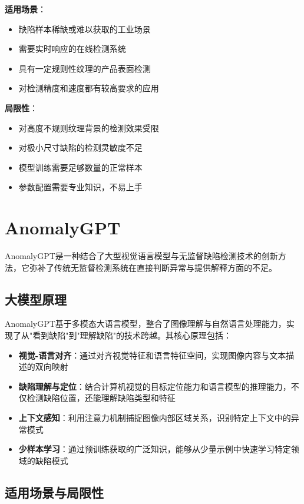 \documentclass[
  ]{njuthesis}
\begin{document}
\textbf{适用场景}：
\begin{itemize}
    \item 缺陷样本稀缺或难以获取的工业场景
    \item 需要实时响应的在线检测系统
    \item 具有一定规则性纹理的产品表面检测
    \item 对检测精度和速度都有较高要求的应用
\end{itemize}

\textbf{局限性}：
\begin{itemize}
    \item 对高度不规则纹理背景的检测效果受限
    \item 对极小尺寸缺陷的检测灵敏度不足
    \item 模型训练需要足够数量的正常样本
    \item 参数配置需要专业知识，不易上手
\end{itemize}

\section{AnomalyGPT}

AnomalyGPT是一种结合了大型视觉语言模型与无监督缺陷检测技术的创新方法，它弥补了传统无监督检测系统在直接判断异常与提供解释方面的不足。

\subsection{大模型原理}

AnomalyGPT基于多模态大语言模型，整合了图像理解与自然语言处理能力，实现了从"看到缺陷"到"理解缺陷"的技术跨越。其核心原理包括：
\begin{itemize}
    \item \textbf{视觉-语言对齐}：通过对齐视觉特征和语言特征空间，实现图像内容与文本描述的双向映射
    \item \textbf{缺陷理解与定位}：结合计算机视觉的目标定位能力和语言模型的推理能力，不仅检测缺陷位置，还能理解缺陷类型和特征
    \item \textbf{上下文感知}：利用注意力机制捕捉图像内部区域关系，识别特定上下文中的异常模式
    \item \textbf{少样本学习}：通过预训练获取的广泛知识，能够从少量示例中快速学习特定领域的缺陷模式
\end{itemize}

\subsection{适用场景与局限性}
\end{document}
